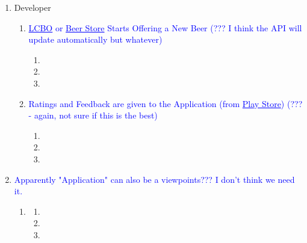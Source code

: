 \documentclass[]{article}
\begin{document}
\begin{enumerate}[{VP}1.]
\begin{enumerate}[{BE1}.1]
	\end{enumerate}
	
	\item Developer
	
	\begin{enumerate}[{BE2}.1]
		\item \textcolor{blue}{\underline{LCBO} or \underline{Beer Store} Starts Offering a New Beer (??? I think the API will update automatically but whatever)}
		\begin{enumerate}
			\item 
			\item 
			\item 
		\end{enumerate}
		
		\item \textcolor{blue}{Ratings and Feedback are given to the Application (from \underline{Play Store}) (??? - again, not sure if this is the best)}
		\begin{enumerate}
			\item 
			\item 
			\item
		\end{enumerate}
		
	\end{enumerate}
	
		\item \textcolor{blue}{Apparently "Application" can also be a viewpoints??? I don't think we need it.}
	
	\begin{enumerate}[{BE3}.1]
		\item
		\begin{enumerate}
			\item 
			\item 
			\item 
		\end{enumerate}
		
	\end{enumerate}
	
\end{enumerate}

\end{document}
